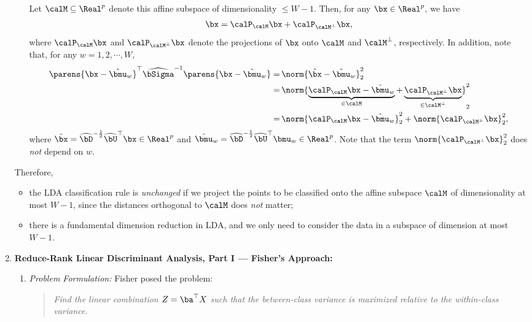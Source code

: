 \documentclass[12pt]{article}
\begin{document}
\begin{enumerate}[label=\textbf{\arabic*.}]
\begin{enumerate}
		Let $\calM \subseteq \Real^p$ denote this affine subspace of dimensionality $\le W - 1$. Then, for any $\bx \in \Real^p$, we have 
		\begin{align*}
			\bx = \calP_{\calM} \bx + \calP_{\calM^{\perp}} \bx, 
		\end{align*}
		where $\calP_{\calM} \bx$ and $\calP_{\calM^\perp} \bx$ denote the projections of $\bx$ onto $\calM$ and $\calM^{\perp}$, respectively. In addition, note that, for any $w = 1, 2, \cdots, W$, 
		\begin{align*}
			\parens{\bx - \hat{\bmu}_w}^\top \widehat{\bSigma}^{-1} \parens{\bx - \hat{\bmu}_w} = & \, \norm{\tilde{\bx} - \tilde{\bmu}_w}_2^2 \\ 
			= & \, \norm{ \underbrace{\calP_{\calM} \bx - \tilde{\bmu}_w}_{\in \calM} + \underbrace{\calP_{\calM^{\perp}} \bx}_{\in \calM^\perp}}_2^2 \\ 
			= & \, \norm{\calP_{\calM} \bx - \tilde{\bmu}_w}_2^2 + \norm{\calP_{\calM^{\perp}} \bx}_2^2, 
		\end{align*}
		where $\tilde{\bx} = \widehat{\bD}^{-\frac{1}{2}} \widehat{\bU}^\top \bx \in \Real^p$ and $\tilde{\bmu}_w = \widehat{\bD}^{-\frac{1}{2}} \widehat{\bU}^\top \bmu_w \in \Real^p$. Note that the term $\norm{\calP_{\calM^{\perp}} \bx}_2^2$ does \emph{not} depend on $w$. 
	\end{enumerate}
	
	Therefore, 
	\begin{itemize}
		\item the LDA classification rule is \emph{unchanged} if we project the points to be classified onto the affine subspace $\calM$ of dimensionality at most $W-1$, since the distances orthogonal to $\calM$ does \emph{not} matter; 
		\item there is a fundamental dimension reduction in LDA, and we only need to consider the data in a subspace of dimension at most $W-1$. 
	\end{itemize}
	
		
	\item \textbf{Reduce-Rank Linear Discriminant Analysis, Part I --- Fisher's Approach:} 
	\begin{enumerate}
		\item \textit{Problem Formulation:} Fisher posed the problem: 
		\begin{quotation}
			\textit{Find the linear combination $Z = \ba^\top X$ such that the between-class variance is maximized relative to the within-class variance. }
		\end{quotation}
		

\end{enumerate}
\end{enumerate}
\end{document}
